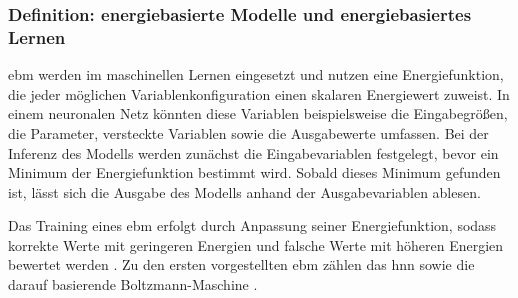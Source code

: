 \subsubsection{Definition: energiebasierte Modelle und energiebasiertes Lernen}

\ac{ebm} werden im maschinellen Lernen eingesetzt und nutzen eine Energiefunktion, die jeder möglichen Variablenkonfiguration einen skalaren Energiewert zuweist. In einem neuronalen Netz könnten diese Variablen beispielsweise die Eingabegrößen, die Parameter, versteckte Variablen sowie die Ausgabewerte umfassen. Bei der Inferenz des Modells werden zunächst die Eingabevariablen festgelegt, bevor ein Minimum der Energiefunktion bestimmt wird. Sobald dieses Minimum gefunden ist, lässt sich die Ausgabe des Modells anhand der Ausgabevariablen ablesen.

Das Training eines \ac{ebm} erfolgt durch Anpassung seiner Energiefunktion, sodass korrekte Werte mit geringeren Energien und falsche Werte mit höheren Energien bewertet werden \cite{Lecun2006}. Zu den ersten vorgestellten \ac{ebm} zählen das \ac{hnn} \cite{Hopfield1984} sowie die darauf basierende Boltzmann-Maschine \cite{Ackley1985}.
